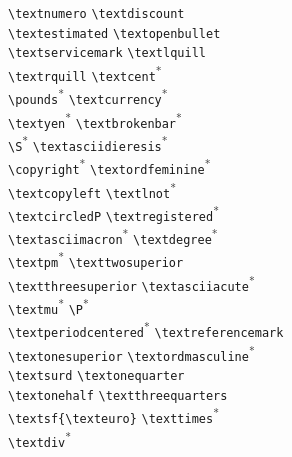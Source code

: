 {\begin{tabbing}
\textnumero \> \lstinline+\textnumero+ \> \textdiscount \> \lstinline+\textdiscount+\\
\textestimated \> \lstinline+\textestimated+ \> \textopenbullet \> \lstinline+\textopenbullet+\\
\textservicemark \> \lstinline+\textservicemark+ \> \textlquill \> \lstinline+\textlquill+\\
\textrquill \> \lstinline+\textrquill+ \> \textcent \> \lstinline+\textcent+\textsuperscript{*} \\
\textsterling \> \lstinline+\pounds+\textsuperscript{*}  \> \textcurrency \> \lstinline+\textcurrency+\textsuperscript{*} \\
\textyen \> \lstinline+\textyen+\textsuperscript{*} \> \textbrokenbar \> \lstinline+\textbrokenbar+\textsuperscript{*} \\
\textsection \> \lstinline+\S+\textsuperscript{*}  \> \textasciidieresis \> \lstinline+\textasciidieresis+\textsuperscript{*} \\
\textcopyright \> \lstinline+\copyright+\textsuperscript{*} \> \textordfeminine \> \lstinline+\textordfeminine+\textsuperscript{*} \\
\textcopyleft \> \lstinline+\textcopyleft+ \> \textlnot \> \lstinline+\textlnot+\textsuperscript{*} \\
\textcircledP \> \lstinline+\textcircledP+ \> \textregistered \> \lstinline+\textregistered+\textsuperscript{*} \\
\textasciimacron \> \lstinline+\textasciimacron+\textsuperscript{*}  \> \textdegree \> \lstinline+\textdegree+\textsuperscript{*} \\
\textpm \> \lstinline+\textpm+\textsuperscript{*} \> \texttwosuperior \> \lstinline+\texttwosuperior+\\
\textthreesuperior \> \lstinline+\textthreesuperior+ \> \textasciiacute \> \lstinline+\textasciiacute+\textsuperscript{*} \\
\textmu \> \lstinline+\textmu+\textsuperscript{*} \> \textparagraph \> \lstinline+\P+\textsuperscript{*} \\
\textperiodcentered \> \lstinline+\textperiodcentered+\textsuperscript{*} \> \textreferencemark \> \lstinline+\textreferencemark+\\
\textonesuperior \> \lstinline+\textonesuperior+ \> \textordmasculine \> \lstinline+\textordmasculine+\textsuperscript{*} \\
\textsurd \> \lstinline+\textsurd+ \> \textonequarter \> \lstinline+\textonequarter+\\
\textonehalf \> \lstinline+\textonehalf+ \> \textthreequarters \> \lstinline+\textthreequarters+\\
\textsf{\texteuro} \> \lstinline+\textsf{\texteuro}+ \> \texttimes \> \lstinline+\texttimes+\textsuperscript{*} \\
\textdiv \> \lstinline+\textdiv+\textsuperscript{*} \\
\end{tabbing}
}



\endinput
